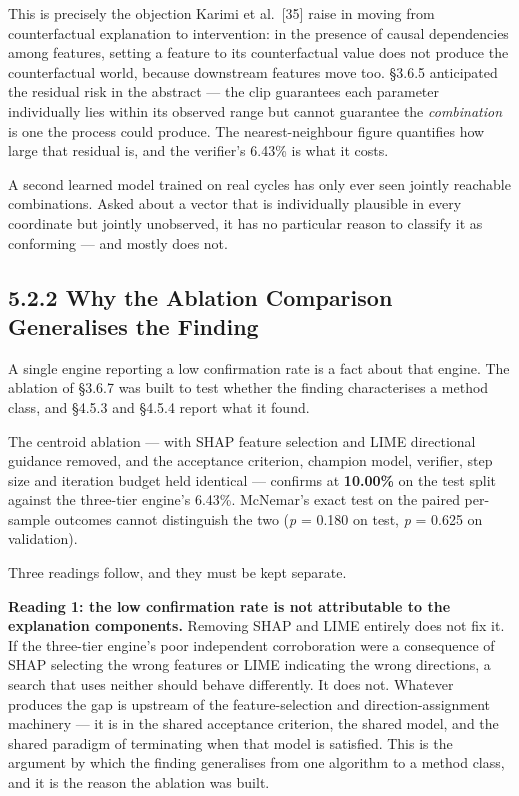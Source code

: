 This is precisely the objection Karimi et al.~{[}35{]} raise in moving from counterfactual explanation to intervention: in the presence of causal dependencies among features, setting a feature to its counterfactual value does not produce the counterfactual world, because downstream features move too. §3.6.5 anticipated the residual risk in the abstract --- the clip guarantees each parameter individually lies within its observed range but cannot guarantee the \emph{combination} is one the process could produce. The nearest-neighbour figure quantifies how large that residual is, and the verifier's 6.43\% is what it costs.

A second learned model trained on real cycles has only ever seen jointly reachable combinations. Asked about a vector that is individually plausible in every coordinate but jointly unobserved, it has no particular reason to classify it as conforming --- and mostly does not.

\hypertarget{why-the-ablation-comparison-generalises-the-finding}{%
\subsection{5.2.2 Why the Ablation Comparison Generalises the Finding}\label{why-the-ablation-comparison-generalises-the-finding}}

A single engine reporting a low confirmation rate is a fact about that engine. The ablation of §3.6.7 was built to test whether the finding characterises a method class, and §4.5.3 and §4.5.4 report what it found.

The centroid ablation --- with SHAP feature selection and LIME directional guidance removed, and the acceptance criterion, champion model, verifier, step size and iteration budget held identical --- confirms at \textbf{10.00\%} on the test split against the three-tier engine's 6.43\%. McNemar's exact test on the paired per-sample outcomes cannot distinguish the two (\emph{p} = 0.180 on test, \emph{p} = 0.625 on validation).

Three readings follow, and they must be kept separate.

\textbf{Reading 1: the low confirmation rate is not attributable to the explanation components.} Removing SHAP and LIME entirely does not fix it. If the three-tier engine's poor independent corroboration were a consequence of SHAP selecting the wrong features or LIME indicating the wrong directions, a search that uses neither should behave differently. It does not. Whatever produces the gap is upstream of the feature-selection and direction-assignment machinery --- it is in the shared acceptance criterion, the shared model, and the shared paradigm of terminating when that model is satisfied. This is the argument by which the finding generalises from one algorithm to a method class, and it is the reason the ablation was built.

